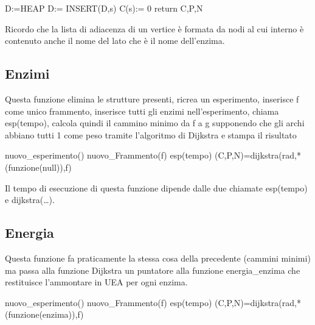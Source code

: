 \documentclass[a4paper,10pt]{article}
\begin{document}
\begin{algorithm}[H]
D:=HEAP\;
D:= INSERT(D,s)\;
C(s):= 0\;
return C,P,N\;
\end{algorithm}
Ricordo che la lista di adiacenza di un vertice è formata da nodi al cui interno è contenuto anche il nome del lato che è il nome dell'enzima.
\subsection{Enzimi}
Questa funzione elimina le strutture presenti, ricrea un esperimento, inserisce f come unico frammento, inserisce tutti gli enzimi nell'esperimento, chiama esp(tempo), calcola quindi il cammino minimo da f a g supponendo che gli archi abbiano tutti 1 come peso tramite l'algoritmo di Dijkstra e stampa il risultato

\begin{algorithm}[H]
nuovo\_{}esperimento()\;
nuovo\_{}Frammento(f)\;
esp(tempo)\;
(C,P,N)=dijkstra(rad,*(funzione(null)),f)\;
\end{algorithm}
Il tempo di esecuzione di questa funzione dipende dalle due chiamate esp(tempo) e dijkstra(\dots{}). 
\subsection{Energia}
Questa funzione fa praticamente la stessa cosa della precedente (cammini minimi) ma passa alla funzione Dijkstra un puntatore alla funzione energia\_{}enzima che restituisce l'ammontare in UEA per ogni enzima.

\begin{algorithm}[H]
nuovo\_{}esperimento()\;
nuovo\_{}Frammento(f)\;
esp(tempo)\;
(C,P,N)=dijkstra(rad,*(funzione(enzima)),f)\;
\end{algorithm}
\end{document}
